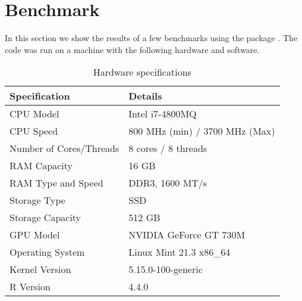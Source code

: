 \section{Benchmark}
In this section we show the results of a few benchmarks using the  package \cite{microbenchmark}. The code was run on a machine with the following hardware and software.
\begin{table}[ht]
    \centering
    \begin{tabular}{@{}ll@{}}
    \toprule
    Specification      & Details                              \\ \midrule
    CPU Model          & Intel i7-4800MQ                 \\
    CPU Speed          & 800 MHz (min) / 3700 MHz (Max)     \\
    Number of Cores/Threads & 8 cores / 8 threads              \\
    RAM Capacity       & 16 GB                                \\
    RAM Type and Speed & DDR3, 1600 MT/s                      \\
    Storage Type       & SSD                                  \\
    Storage Capacity   & 512 GB                               \\
    GPU Model          & NVIDIA GeForce GT 730M              \\
    Operating System   & Linux Mint 21.3 x86\_64                   \\
    Kernel Version     & 5.15.0-100-generic                    \\
    R Version          & 4.4.0                                \\
    \bottomrule
    \end{tabular}
    \caption{Hardware specifications}
    \label{tab:specs}
    \end{table}